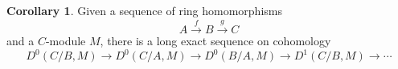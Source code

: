 \documentclass{article}
\theoremstyle{definition}
\theoremstyle{definition}
\theoremstyle{definition}
\theoremstyle{definition}
\theoremstyle{definition}
\theoremstyle{definition}
\newtheorem{corollary}{Corollary}[theorem]
\theoremstyle{definition}
\begin{document}
\begin{corollary}
	Given a sequence of ring homomorphisms
	\[A\xrightarrow{f} B\xrightarrow{g} C\]
	and a $C$-module $M$, there is a long exact sequence on cohomology 
	\[D^0(C/B,M)\to D^0(C/A,M)\to D^0(B/A,M)\to D^{1}(C/B,M)\to\cdots\]
\end{corollary}
\end{document}
